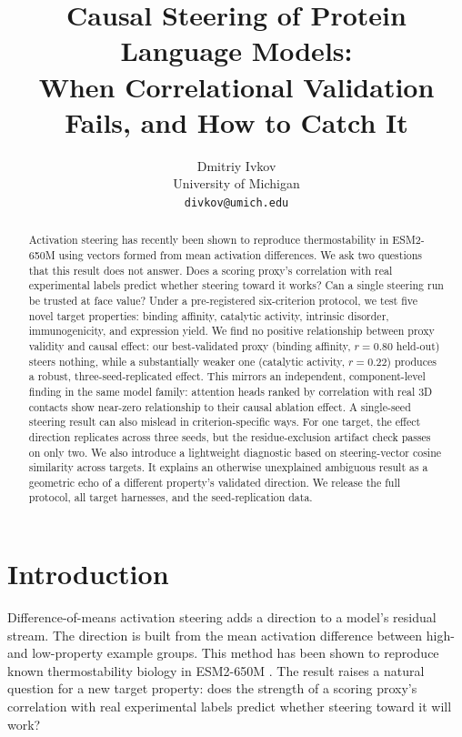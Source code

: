 \documentclass{article}
\title{Causal Steering of Protein Language Models: \\
When Correlational Validation Fails, and How to Catch It}
\author{Dmitriy Ivkov \\
University of Michigan \\
\texttt{divkov@umich.edu}}
\date{}
\begin{document}
\maketitle

\begin{abstract}
Activation steering has recently been shown to reproduce thermostability
in ESM2-650M using vectors formed from mean activation differences. We ask two questions that
this result does not answer. Does a scoring proxy's correlation with real
experimental labels predict whether steering toward it works? Can a
single steering run be trusted at face value? Under a pre-registered
six-criterion protocol, we test five novel target properties: binding
affinity, catalytic activity, intrinsic disorder, immunogenicity, and
expression yield. We find no positive
relationship between proxy validity and causal effect: our
best-validated proxy (binding affinity, $r=0.80$ held-out) steers nothing,
while a substantially weaker one (catalytic activity, $r=0.22$) produces
a robust, three-seed-replicated effect. This mirrors an independent,
component-level finding in the same model family: attention heads ranked
by correlation with real 3D contacts show near-zero relationship to their
causal ablation effect. A single-seed steering result can also mislead in
criterion-specific ways. For one target, the effect direction replicates
across three seeds, but the residue-exclusion artifact check passes on
only two. We also introduce a lightweight diagnostic based on
steering-vector cosine similarity across targets. It explains an
otherwise unexplained ambiguous result as a geometric echo of a different
property's validated direction. We release the full
protocol, all target harnesses, and the seed-replication data.
\end{abstract}

\section{Introduction}

Difference-of-means activation steering adds a direction to a model's
residual stream. The direction is built from the mean activation
difference between high- and low-property example groups. This method has
been shown to reproduce known thermostability biology in ESM2-650M
\citep{huang2025steering}. The result raises a natural question for a new
target property: does the strength of a scoring proxy's correlation with
real experimental labels predict whether steering toward it will work?
\end{document}
